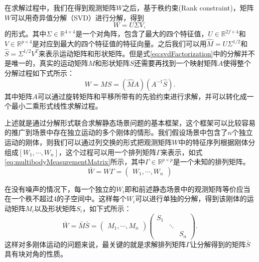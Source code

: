 在求解过程中，我们在得到观测矩阵$W$之后，基于秩约束(Rank constraint)\cite{Costeira1998A}，矩阵$W$可以用奇异值分解（SVD）进行分解，得到
\begin{equation}\label{eq:svdFactorization}
W=U\Sigma V,
\end{equation}
的形式。其中$\Sigma\in \mathbb{R}^{4\times4}$是一个对角阵，包含了最大的四个特征值，$U\in \mathbb{R}^{2f\times4}$和$V\in \mathbb{R}^{p\times4}$是对应到最大的四个特征值的特征向量。之后我们可以用$\hat{M}=U\Sigma^{1/2}$和$\hat{S}=\Sigma^{1/2}V^T$来表示运动矩阵和形状矩阵。但是式\eqref{eq:svdFactorization}中的分解并不是唯一的，真实的运动矩阵$M$和形状矩阵$S$还需要再找到一个映射矩阵$A$使得整个分解过程如下式所示：
\begin{equation}
W=M S=(\hat{M}A)(A^{-1}\hat{S}).
\end{equation}
其中矩阵$A$可以通过旋转矩阵和平移所带有的先验约束进行求解，并可以转化成一个最小二乘形式线性求解过程\cite{Costeira1998A,Tomasi1992Shape}。

上述就是通过分解形式联合求解静态场景问题的基本框架，这个框架可以比较容易的推广到场景中存在独立运动的多个刚体的情形\cite{Costeira1998A}。我们假设场景中包含了$n$个独立运动的刚体，则我们可以通过列交换的形式把观测矩阵$W$中的特征序列根据刚体分组成$[W_1,\cdots,W_n]$，这个过程可以用一个排列矩阵$\Gamma$来表示，如式\eqref{eq:multibodyMeasurementMatrix}所示，其中$\Gamma\in \mathbb{R}^{p\times p}$是一个未知的排列矩阵。
\begin{equation}\label{eq:multibodyMeasurementMatrix}
\bar{W}=W \Gamma=\begin{pmatrix}
W_1,\cdots,W_n
\end{pmatrix}
\end{equation}

在没有噪声的情况下，每一个独立的$W_i$即和前述静态场景中的观测矩阵等价应当在一个秩不超过4的子空间中。这样每个$W_i$可以进行单独的分解，得到该刚体的运动矩阵$M_i$以及形状矩阵$S_i$，如下式所示：
\begin{equation}\label{eq:multibodyFactorization}
\bar{W}=\bar{M} \bar{S} = 
\begin{pmatrix}
M_1,\cdots,M_n
\end{pmatrix}
\begin{pmatrix}
S_1 & &\\
&\ddots&\\
&      &S_n
\end{pmatrix}
.\end{equation}
这样对多刚体运动的问题来说，最关键的就是求解排列矩阵$\Gamma$让分解得到的矩阵$\bar{S}$具有块对角的性质。

